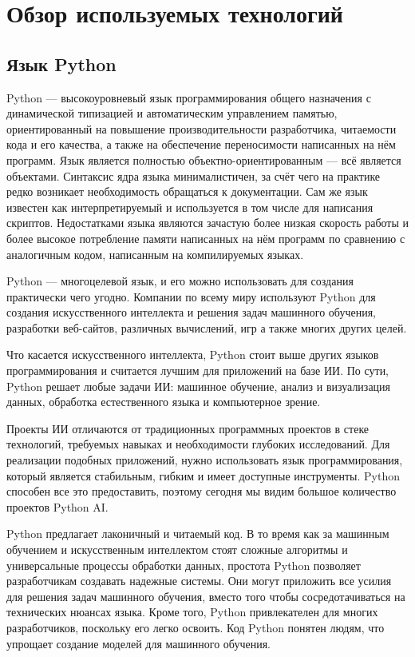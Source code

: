 \lstset{style=fsharpstyle}

\section{Обзор используемых технологий} 
\label{sec:practice:technology_used}

\subsection{Язык Python}

Python — высокоуровневый язык программирования общего назначения с динамической типизацией и автоматическим управлением памятью, ориентированный на повышение производительности разработчика, читаемости кода и его качества, а также на обеспечение переносимости написанных на нём программ. Язык является полностью объектно-ориентированным --- всё является объектами. Синтаксис ядра языка минималистичен, за счёт чего на практике редко возникает необходимость обращаться к документации. Сам же язык известен как интерпретируемый и используется в том числе для написания скриптов. Недостатками языка являются зачастую более низкая скорость работы и более высокое потребление памяти написанных на нём программ по сравнению с аналогичным кодом, написанным на компилируемых языках. 

Python — многоцелевой язык, и его можно использовать для создания практически чего угодно. Компании по всему миру используют Python для создания искусственного интеллекта и решения задач машинного обучения, разработки веб-сайтов, различных вычислений, игр а также многих других целей.

Что касается искусственного интеллекта, Python стоит выше других языков программирования и считается лучшим для приложений на базе ИИ. По сути, Python решает любые задачи ИИ: машинное обучение, анализ и визуализация данных, обработка естественного языка и компьютерное зрение.

Проекты ИИ отличаются от традиционных программных проектов в стеке технологий, требуемых навыках и необходимости глубоких исследований. Для реализации подобных приложений, нужно использовать язык программирования, который является стабильным, гибким и имеет доступные инструменты. Python способен все это предоставить, поэтому сегодня мы видим большое количество проектов Python AI.

Python предлагает лаконичный и читаемый код. В то время как за машинным обучением и искусственным интеллектом стоят сложные алгоритмы и универсальные процессы обработки данных, простота Python позволяет разработчикам создавать надежные системы. Они могут приложить все усилия для решения задач машинного обучения, вместо того чтобы сосредотачиваться на технических нюансах языка. Кроме того, Python привлекателен для многих разработчиков, поскольку его легко освоить. Код Python понятен людям, что упрощает создание моделей для машинного обучения. \cite{python_for_ml}

